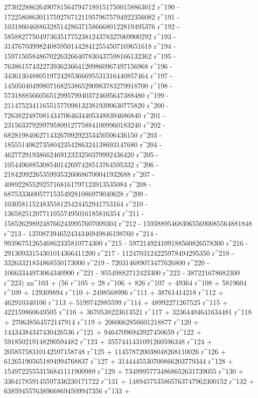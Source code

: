        2730228862649078156479471891517500158863012 r^190 - 
       1722580863011759276712119579675794922356082 r^191 - 
       1031860468863285142863715866680122819495376 r^192 - 
       585882775049736351775238124378327069900292 r^193 - 
       314767039982408595014428412554507169651618 r^194 - 
       159715058486702263266407830437598166132362 r^195 - 
       76386157432273936236641209860967497156968 r^196 - 
       34361304880519724285366695531316440857464 r^197 - 
       14505040499807168253865290983783279918700 r^198 - 
       5731888566056512995799403724695647388480 r^199 - 
       2114752341165515770981323819390630775820 r^200 - 
       726382248708143470646344053488394686840 r^201 - 
       231563379299795809127758841009960183240 r^202 - 
       68281984062714326709292253450506436150 r^203 - 
       18555140627358042354286324138693147680 r^204 - 
       4627729193866246912323250379992436420 r^205 - 
       1054496885308540142697428513764595332 r^206 - 
       218420922653599353260686700041932688 r^207 - 
       40892285529257168161797123913535084 r^208 - 
       6875333600577153549281086979040628 r^209 - 
       1030581152483558125424452941753164 r^210 - 
       136582512077110557495016185816354 r^211 - 
       15852629892487662439957607009304 r^212 - 
       1593889546830655690085564881848 r^213 - 
       137087394652434346949846198760 r^214 - 
       9939675126546862335810774300 r^215 - 
       597214924109188560826578300 r^216 - 
       29130933154301014366411200 r^217 - 
       1124703124225978494295350 r^218 - 
       33263321834868550173000 r^219 - 720314689073477626800 r^220 - 
       10663344973064340900 r^221 - 95549882712423300 r^222 - 
       387221678682300 r^223) xn^103 + (56 r^105 + 28 r^106 + 
       826 r^107 + 49364 r^108 + 5819604 r^109 + 129309894 r^110 + 
       2498568996 r^111 + 38761414218 r^112 + 462910340106 r^113 + 
       5199742885599 r^114 + 48992271267525 r^115 + 
       422159860649505 r^116 + 3670538223613521 r^117 + 
       32364404641634481 r^118 + 270638564572147914 r^119 + 
       2060662856601218877 r^120 + 14434384347430426536 r^121 + 
       94647096943927450659 r^122 + 591850219148290594482 r^123 + 
       3557441431091260596348 r^124 + 20585758310142597158748 r^125 + 
       114578720038048268110026 r^126 + 
       612651905651894994768837 r^127 + 
       3144445530700866203779344 r^128 + 
       15497225553156841111900989 r^129 + 
       73499957734868652631739055 r^130 + 
       336417859145597336230171722 r^131 + 
       1489457535865763747962300152 r^132 + 
       6385945576389668694509947356 r^133 + 

